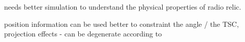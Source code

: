 needs better simulation to understand the physical properties of radio relic.

position information can be used better to constraint the angle / the TSC,
projection effects - can be degenerate according to \cite{S13}   
